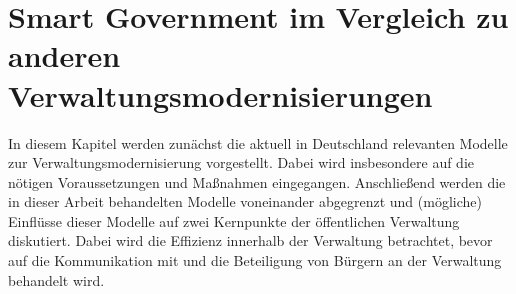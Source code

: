 \section{Smart Government im Vergleich zu anderen Verwaltungsmodernisierungen}
In diesem Kapitel werden zunächst die aktuell in Deutschland relevanten Modelle zur Verwaltungsmodernisierung vorgestellt.
Dabei wird insbesondere auf die nötigen Voraussetzungen und Maßnahmen eingegangen.
Anschließend werden die in dieser Arbeit behandelten Modelle voneinander abgegrenzt und (mögliche) Einflüsse dieser Modelle auf zwei Kernpunkte der öffentlichen Verwaltung diskutiert.
Dabei wird die Effizienz innerhalb der Verwaltung betrachtet, bevor auf die Kommunikation mit und die Beteiligung von Bürgern an der Verwaltung behandelt wird.



